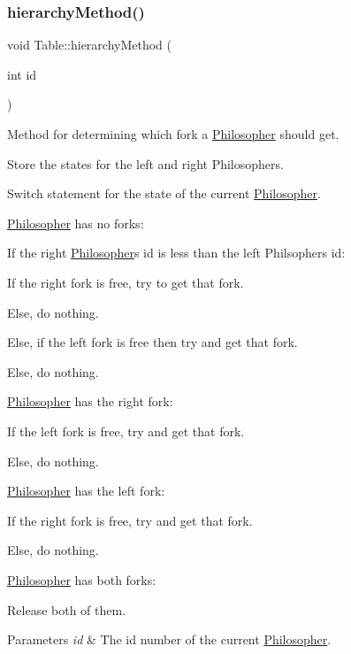 \subsubsection{\texorpdfstring{hierarchy\+Method()}{hierarchyMethod()}}
{\footnotesize\ttfamily void Table\+::hierarchy\+Method (\begin{DoxyParamCaption}\item[{int}]{id }\end{DoxyParamCaption})}



Method for determining which fork a \hyperlink{class_philosopher}{Philosopher} should get. 


\begin{DoxyItemize}
\item Store the states for the left and right Philosophers.
\item Switch statement for the state of the current \hyperlink{class_philosopher}{Philosopher}.
\begin{DoxyItemize}
\item \hyperlink{class_philosopher}{Philosopher} has no forks\+:
\begin{DoxyItemize}
\item If the right \hyperlink{class_philosopher}{Philosopher}\textquotesingle{}s id is less than the left Philsopher\textquotesingle{}s id\+:
\begin{DoxyItemize}
\item If the right fork is free, try to get that fork.
\item Else, do nothing.
\end{DoxyItemize}
\item Else, if the left fork is free then try and get that fork.
\item Else, do nothing.
\end{DoxyItemize}
\item \hyperlink{class_philosopher}{Philosopher} has the right fork\+:
\begin{DoxyItemize}
\item If the left fork is free, try and get that fork.
\item Else, do nothing.
\end{DoxyItemize}
\item \hyperlink{class_philosopher}{Philosopher} has the left fork\+:
\begin{DoxyItemize}
\item If the right fork is free, try and get that fork.
\item Else, do nothing.
\end{DoxyItemize}
\item \hyperlink{class_philosopher}{Philosopher} has both forks\+:
\begin{DoxyItemize}
\item Release both of them.
\end{DoxyItemize}
\end{DoxyItemize}
\end{DoxyItemize}
\begin{DoxyParams}{Parameters}
{\em id} & The id number of the current \hyperlink{class_philosopher}{Philosopher}. \\
\hline
\end{DoxyParams}


